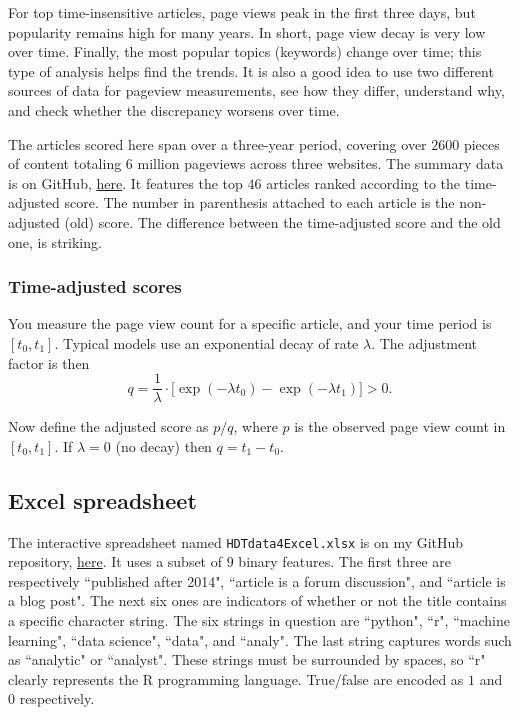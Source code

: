 \documentclass[oneside,10pt]{book}
\begin{document}
For top time-insensitive articles, page views peak in the first three days, but popularity remains high for many years.  In short, page view decay is very low over time. Finally, the most popular topics (keywords) change over time; this type of analysis helps find the trends. It is also a good idea to use two different sources of data for pageview
 measurements, see how they differ, understand why, and check whether the discrepancy worsens over time.

The articles scored here span over a three-year period, covering over $\num{2600}$ pieces of content totaling $6$ million pageviews across three websites. 
The summary data is on GitHub, \href{https://github.com/VincentGranville/Machine-Learning/blob/main/Source\%20Code/ArticlePopularity.txt}{here}. It features the top $46$
 articles ranked according to the time-adjusted score. The number in parenthesis attached to each article is the non-adjusted (old) score. The difference between the time-adjusted score and the old one, is striking. 

\subsubsection{Time-adjusted scores}

You measure the page view count for a specific article, and your time period is  $[t_0, t_1]$. Typical models use 
 an \textcolor{index}{exponential decay} of rate $\lambda$. The adjustment factor is then
 $$q = \frac{1}{\lambda}\cdot \Big[\exp(-\lambda t_0) -  \exp(-\lambda t_1)\Big] > 0.$$


Now define the adjusted score as $p / q$, where $p$ is the observed page view count in $[t_0, t_1]$. If $\lambda = 0$ (no decay) then $q = t_1-t_0$. 

\subsection{Excel spreadsheet}\label{excerds}

The interactive spreadsheet named \texttt{HDTdata4Excel.xlsx} is on my GitHub repository, \href{https://github.com/VincentGranville/Machine-Learning/blob/main/Spreadsheets/HDTdata4Excel.xlsx}{here}. It uses a subset of $9$ binary features. The first three are respectively ``published after 2014", 
``article is a forum discussion", and ``article is a blog post". The next six ones are indicators of whether or not the title contains a specific character string. The six strings in question are ``python", ``r",  ``machine learning", ``data science", ``data",  and ``analy". The last string captures words such as ``analytic" or
 ``analyst". These strings must be surrounded by spaces, so ``r" clearly represents the R programming language. True/false are encoded as $1$ and $0$ respectively. 
\end{document}
